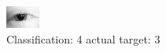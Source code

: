 \begin{figure}[h!]
\begin{center}
\includegraphics[width=0.60\columnwidth]{figures/ID83_class_4_target_3.png}
\end{center}
\caption{ Classification: 4 actual target: 3}
\label{fig:ID83_class_4_target_3}
\end{figure}
